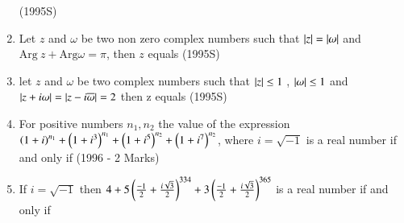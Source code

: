 \documentclass[journal,12pt,twocolumn]{IEEEtran}
\theoremstyle{remark}
\begin{document}
\begin{enumerate}[start=6]
\hfill{(1995S)}
\begin{enumerate}
\end{enumerate}
\item Let $z$ and $\omega$ be two non zero complex numbers such that $\left\vert z\right\vert=\left\vert\omega\right\vert$ and $\mathrm{Arg}\ z+\mathrm{Arg}\omega=\pi$, then $z$ equals 
\hfill{(1995S)}
\begin{enumerate}
\end{enumerate}
\item let $z$ and $\omega$ be two complex numbers such that $\left\vert z\right\vert\leq1$ , $\left\vert\omega\right\vert\leq1$ and $\left\vert z+i\omega\right\vert=\left\vert z-i\overline{\omega}\right\vert=2$ then z equals 
\hfill{(1995S)}
\begin{enumerate}
\end{enumerate}
\item For positive numbers $n_1,n_2$ the value of the expression $\left(1+i\right)^{n_1}+\left(1+i^3\right)^{n_1}+\left(1+i^5\right)^{n_2}+\left(1+i^7\right)^{n_2}$, where $i=\sqrt{-1}$ is a real number if and only if
\hfill{(1996 - 2 Marks)}
\begin{enumerate}
\end{enumerate}
\item If $i=\sqrt{-1}$ then $4+5\left(\frac{-1}{2}+\frac{i\sqrt{3}}{2}\right)^{334} + 3\left(\frac{-1}{2}+\frac{i\sqrt{3}}{2}\right)^{365}$ is a real number if and only if 

\end{enumerate}
\end{document}
